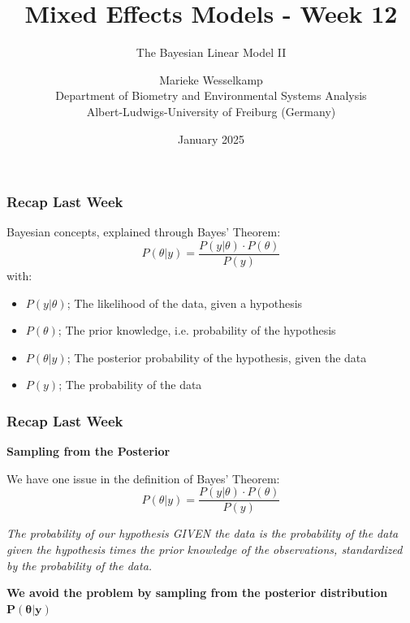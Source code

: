 \documentclass{beamer}
\title{Mixed Effects Models - Week 12}
\subtitle{The Bayesian Linear Model II}
\author{Marieke Wesselkamp\\Department of Biometry and Environmental Systems Analysis\\Albert-Ludwigs-University of Freiburg (Germany)}
\date{January 2025}
\begin{document}
\frame{\titlepage}

\begin{frame}
    \frametitle{Recap Last Week}
    Bayesian concepts, explained through Bayes' Theorem:
    \[
    P(\theta|y) = \frac{P(y|\theta) \cdot P(\theta)}{P(y)}
    \]
    with:
    \begin{itemize}
        \item $P(y|\theta)$; The likelihood of the data, given a hypothesis
        \item $P(\theta)$; The prior knowledge, i.e. probability of the hypothesis
        \item $P(\theta|y)$; The posterior probability of the hypothesis, given the data
        \item $P(y)$; The probability of the data
    \end{itemize}
\end{frame}

\begin{frame}
    \frametitle{Recap Last Week}
    \textbf{Sampling from the Posterior}\vspace{0.3cm}
    
     We have one issue in the definition of Bayes' Theorem:
    \[
    P(\theta|y) = \frac{P(y|\theta) \cdot P(\theta)}{P(y)}
    \]
    \vspace{0.2cm}

    \textit{The probability of our hypothesis GIVEN the data is the probability of the data given the hypothesis times the prior knowledge of the observations, standardized by the probability of the data.}
    \vspace{0.2cm}

    \textbf{We avoid the problem by sampling from the posterior distribution} $\mathbf{P(\theta|y)}$
\end{frame}
\end{document}
